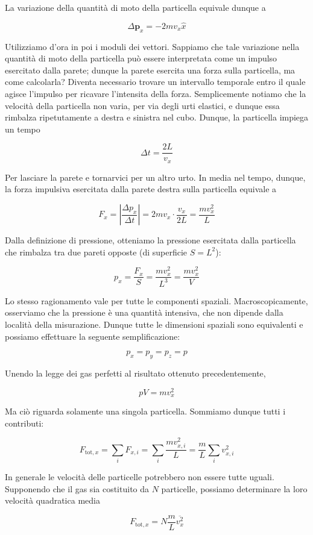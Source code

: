 La variazione della quantità di moto della particella equivale dunque
a

\[ \Delta\mathbf{p}_x = -2mv_x\hat{x} \]

Utilizziamo d'ora in poi i moduli dei vettori. Sappiamo che tale
variazione nella quantità di moto della particella può essere
interpretata come un impulso esercitato dalla parete; dunque la
parete esercita una forza sulla particella, ma come calcolarla?
Diventa necessario trovare un intervallo temporale entro il quale
agisce l'impulso per ricavare l'intensita della forza.
Semplicemente notiamo che la velocità della particella non varia,
per via degli urti elastici, e dunque essa rimbalza ripetutamente
a destra e sinistra nel cubo. Dunque, la particella impiega un tempo

\[ \Delta t = \frac{2L}{v_x} \]

Per lasciare la parete e tornarvici per un altro urto. In media nel
tempo, dunque, la forza impulsiva esercitata dalla parete destra
sulla particella equivale a

\[ F_x = \left|\frac{\Delta p_x}{\Delta t}\right| = 2mv_x \cdot \frac{v_x}{2L} = \frac{mv_x^2}{L} \]

Dalla definizione di pressione, otteniamo la pressione esercitata
dalla particella che rimbalza tra due pareti opposte (di superficie
$S = L^2$):

\[ p_x = \frac{F_x}{S} = \frac{mv_x^2}{L^3} = \frac{mv_x^2}{V} \]

Lo stesso ragionamento vale per tutte le componenti spaziali.
Macroscopicamente, osserviamo che la pressione è una quantità intensiva,
che non dipende dalla località della misurazione. Dunque tutte
le dimensioni spaziali sono equivalenti e possiamo effettuare la
seguente semplificazione:

\[ p_x = p_y = p_z = p \]

Unendo la legge dei gas perfetti al risultato ottenuto precedentemente,

\[ pV = mv_x^2 \]

Ma ciò riguarda solamente una singola particella. Sommiamo dunque
tutti i contributi:

\[ F_{\text{tot}, x} = \sum_i F_{x,i} = \sum_i \frac{mv_{x,i}^2}{L} = \frac{m}{L}\sum_iv_{x,i}^2 \]

In generale le velocità delle particelle potrebbero non essere tutte
uguali. Supponendo che il gas sia costituito da $N$ particelle, possiamo
determinare la loro velocità quadratica media

\[ F_{\text{tot},x} = N\frac{m}{L}\overline{v_x^2} \]

